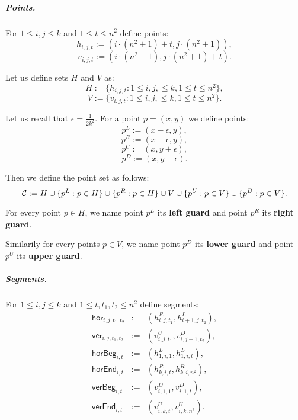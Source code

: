 \subparagraph{Points.}

For $1 \le i,j \le k$ and $1 \le t \le n^2$ define points:
	$$h_{i, j, t} := (i \cdot (n^2+1) + t, j \cdot (n^2+1)),$$
	$$v_{i, j, t} := (i \cdot (n^2+1), j \cdot (n^2+1) + t).$$
	
Let us define sets $H$ and $V$ as:
$$H := \{h_{i, j, t} : 1 \le i, j, \le k, 1 \le t \le n^2\},$$
$$V := \{v_{i, j, t} : 1 \le i, j, \le k, 1 \le t \le n^2\}.$$
	
Let us recall that $\epsilon = \frac{1}{2k^2}$.
For a point $p = (x, y)$ we define points:
$$p^{L} := (x - \epsilon, y),$$
$$p^{R} := (x + \epsilon, y),$$
$$p^{U} := (x, y + \epsilon),$$
$$p^{D} := (x, y - \epsilon).$$

Then we define the point set as follows:
$$\mathcal{C} := H \cup \{p^L : p \in H\} \cup \{p^R : p \in H\}
\cup V \cup \{p^U : p \in V\} \cup \{p^D : p \in V\}.$$

\begin{defi}
	\label{guard_def}
	For every point $p \in H$, we name point $p^L$ its \textbf{left guard}
	and point $p^R$ its \textbf{right guard}.
	
	Similarily for every points $p \in V$, we name point $p^D$ its \textbf{lower guard}
	and point $p^U$ its \textbf{upper guard}.
\end{defi}

\subparagraph{Segments.}
\newcommand{\hor}[4]{\mathsf{hor}_{#1,#2,#3,#4}}
\newcommand{\ver}[4]{\mathsf{ver}_{#1,#2,#3,#4}}
\newcommand{\horbeg}[2]{\mathsf{horBeg}_{#1,#2}}
\newcommand{\verbeg}[2]{\mathsf{verBeg}_{#1,#2}}
\newcommand{\horend}[2]{\mathsf{horEnd}_{#1,#2}}
\newcommand{\verend}[2]{\mathsf{verEnd}_{#1,#2}}

For $1 \le i,j \le k$ and $1 \le t, t_1, t_2 \le n^2$ define segments:
\begin{eqnarray*}
\hor{i}{j}{t_1}{t_2} & := & (h^R_{i,j,t_1}, h^L_{i+1, j, t_2}), \\
\ver{i}{j}{t_1}{t_2} & := & (v^U_{i,j,t_1}, v^D_{i, j+1, t_2}), \\
\horbeg{i}{t} & := & (h^L_{1, i, 1}, h^L_{1, i, t}), \\
\horend{i}{t} & := & (h^R_{k, i, t}, h^R_{k, i, n^2}), \\
\verbeg{i}{t} & := & (v^D_{i, 1, 1}, v^D_{i, 1, t}), \\
\verend{i}{t} & := & (v^U_{i, k, t}, v^U_{i, k, n^2}). \\
\end{eqnarray*}

\newcommand{\allhor}{\mathsf{HOR}}
\newcommand{\allver}{\mathsf{VER}}
\newcommand{\alldiag}{\mathsf{DIAG}}

